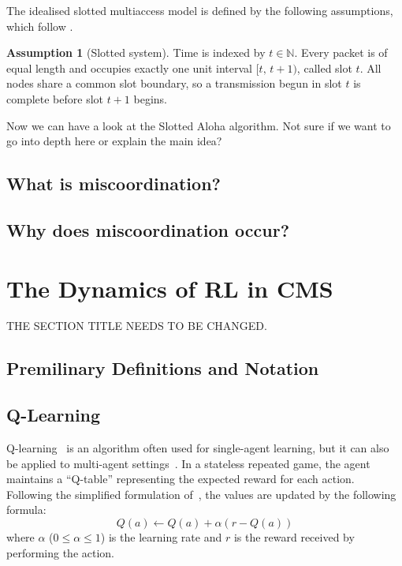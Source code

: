 \documentclass{article}
\theoremstyle{definition}    %
\newtheorem{assumption}{Assumption}[section]
\begin{document}
The idealised slotted multiaccess model is defined by the following
assumptions, which follow \cite{bertsekas1992data}.

\begin{assumption}[Slotted system]\label{asm:slots}
  Time is indexed by $t \in \mathbb{N}$. Every packet is of equal length
  and occupies exactly one unit interval $[t,\,t+1)$, called slot $t$.
  All nodes share a common slot boundary, so a transmission begun in
  slot $t$ is complete before slot $t+1$ begins.
\end{assumption}

Now we can have a look at the Slotted Aloha algorithm. Not sure if we want to go into depth here or explain the main idea?



\subsection{What is miscoordination?}



\subsection{Why does miscoordination occur?}

\section{The Dynamics of RL in CMS}
THE SECTION TITLE NEEDS TO BE CHANGED.

\subsection{Premilinary Definitions and Notation}



\subsection{Q-Learning}

Q-learning~\cite{watkins1992q} is an algorithm often used for single-agent learning, but it can also be applied to multi-agent settings~\cite{claus1998dynamics}. In a stateless repeated game, the agent maintains a ``Q-table'' representing the expected reward for each action. Following the simplified formulation of~\cite{claus1998dynamics}, the values are updated by the following formula:
$$
Q(a) \leftarrow Q(a) + \alpha(r - Q(a))
$$
where $\alpha$ ($0 \leq \alpha \leq 1$) is the learning rate and $r$ is the reward received by performing the action.
\end{document}
